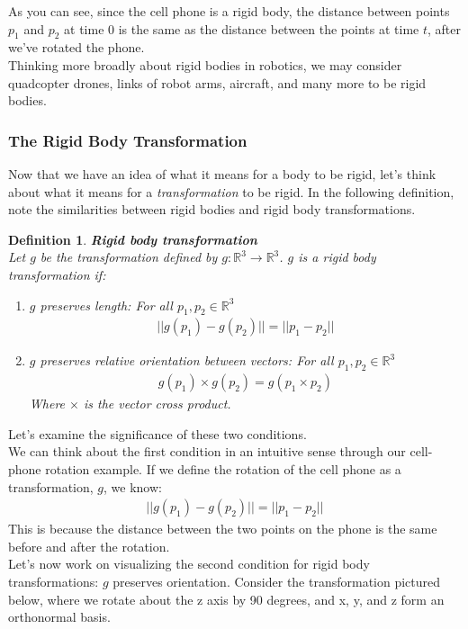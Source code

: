 \documentclass[oneside]{book}
\newtheorem{definition}{Definition}
\newenvironment{defn} %
  {\colorlet{shadecolor}{orange!15}\begin{shaded}\begin{definition}}
  {\end{definition}\end{shaded}}
\begin{document}
As you can see, since the cell phone is a rigid body, the distance between points $p_1$ and $p_2$ at time 0 is the same as the distance between the points at time $t$, after we've rotated the phone.\\
Thinking more broadly about rigid bodies in robotics, we may consider quadcopter drones, links of robot arms, aircraft, and many more to be rigid bodies.

\subsubsection{The Rigid Body Transformation}
Now that we have an idea of what it means for a body to be rigid, let's think about what it means for a \textit{transformation} to be rigid. In the following definition, note the similarities between rigid bodies and rigid body transformations.
\begin{defn}
\textbf{Rigid body transformation}\\
Let $g$ be the transformation defined by $g:\mathbb{R}^3\to \mathbb{R}^3$. $g$ is a rigid body transformation if:
\begin{enumerate}
    \item $g$ preserves length: For all $p_1, p_2 \in \mathbb{R}^3$
    \begin{align*}
        ||g(p_1) - g(p_2)|| = ||p_1 - p_2||
    \end{align*}
    \item $g$ preserves relative orientation between vectors: For all $p_1, p_2 \in \mathbb{R}^3$
    \begin{align*}
        g(p_1)\times g(p_2) = g(p_1 \times p_2)
    \end{align*}
    Where $\times$ is the vector cross product.
\end{enumerate}
\end{defn}\noindent
Let's examine the significance of these two conditions. \\
We can think about the first condition in an intuitive sense through our cell-phone rotation example. If we define the rotation of the cell phone as a transformation, $g$, we know:
\begin{align}
    ||g(p_1) - g(p_2)|| = ||p_1 - p_2||
\end{align}
This is because the distance between the two points on the phone is the same before and after the rotation.\\
Let's now work on visualizing the second condition for rigid body transformations: $g$ preserves orientation. Consider the transformation pictured below, where we rotate about the z axis by 90 degrees, and x, y, and z form an orthonormal basis.
\end{document}

